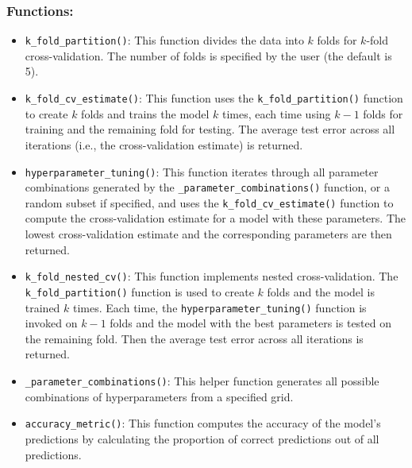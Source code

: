 \documentclass{article}
\begin{document}
\subsubsection*{Functions:}

\begin{itemize}
    
    \item \texttt{k\_fold\_partition()}:  
    This function divides the data into \( k \) folds for \( k \)-fold cross-validation. The number of folds is specified by the user (the default is 5).
    
    \item \texttt{k\_fold\_cv\_estimate()}:  
    This function uses the \texttt{k\_fold\_partition()} function to create \( k \) folds and trains the model \( k \) times, each time using \( k-1 \) folds for training and the remaining fold for testing. The average test error across all iterations (i.e., the cross-validation estimate) is returned.
    
    \item \texttt{hyperparameter\_tuning()}: 
        This function iterates through all parameter combinations generated by the \texttt{\_parameter\_combinations()} function, or a random subset if specified, and uses the \texttt{k\_fold\_cv\_estimate()} function to compute the cross-validation estimate for a model with these parameters. The lowest cross-validation estimate and the corresponding parameters are then returned.
        
    \item \texttt{k\_fold\_nested\_cv()}: 
    This function implements nested cross-validation. The \texttt{k\_fold\_partition()} function is used to create \( k \) folds and the model is trained \( k \) times. Each time, the \texttt{hyperparameter\_tuning()} function is invoked on \( k-1 \) folds and the model with the best parameters is tested on the remaining fold. Then the average test error across all iterations is returned.

    \item \texttt{\_parameter\_combinations()}: 
    This helper function generates all possible combinations of hyperparameters from a specified grid.

\item \texttt{accuracy\_metric()}: 
    This function computes the accuracy of the model’s predictions by calculating the proportion of correct predictions out of all predictions.


\end{itemize}
\end{document}
